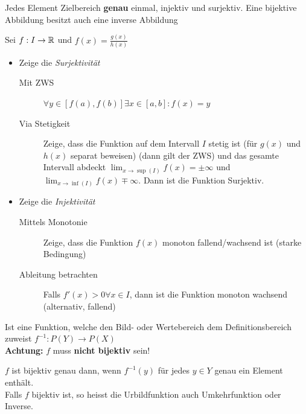 \documentclass[a4paper]{article}
\begin{document}
	\begin{fdef}[bijektiv]
		Jedes Element Zielbereich \textbf{genau} einmal, injektiv
		und surjektiv. Eine bijektive Abbildung besitzt auch eine
		inverse Abbildung
	\end{fdef}
	\begin{fmerke}
		Sei $f: I\rightarrow \mathbb{R}$ und $f(x) = \frac{g(x)}{h(x)}$
		\begin{itemize}
		 \item Zeige die \emph{Surjektivität} 
		 	\begin{description}
		 	 \item[Mit ZWS] $\forall y \in [f(a), f(b)] \exists x \in [a,b]: f(x)=y$
		 	 \item[Via Stetigkeit] Zeige, dass die Funktion auf dem Intervall $I$ stetig ist (für $g(x)$ und $h(x)$ separat beweisen) (dann gilt der ZWS) und das gesamte Intervall abdeckt $\lim_{x \rightarrow \sup(I)} f(x) = \pm \infty$ und $\lim_{x\rightarrow \inf(I)} f(x) \mp \infty$. Dann ist die Funktion Surjektiv.
		 	\end{description}
		 \item Zeige die \emph{Injektivität}
		 	\begin{description}
		 	 \item[Mittels Monotonie] Zeige, dass die Funktion $f(x)$ monoton fallend/wachsend ist (starke Bedingung) 
		 	 \item[Ableitung betrachten] Falls $f'(x) > 0 \forall x \in I$, dann ist die Funktion monoton wachsend (alternativ, fallend)
		 	\end{description}

		\end{itemize}

	\end{fmerke}


\begin{multicols}{2}
	\begin{fdef}[Urbildfunktion]
		Ist eine Funktion, welche den Bild- oder Wertebereich dem
		Definitionsbereich zuweist $f^{-1}: P(Y) \rightarrow P(X)$\\
		\textbf{Achtung:} $f$ muss \textbf{nicht bijektiv} sein!
	\end{fdef}

	\begin{fsatz}[]\vspace{-1mm}
		$f$ ist bijektiv genau dann, wenn $f^{-1}({y})$ für jedes $y \in
		Y$ genau ein Element enthält.\\
		Falls $f$ bijektiv ist, so heisst die Urbildfunktion auch
		Umkehrfunktion oder Inverse.
	\end{fsatz}
\end{multicols}
\end{document}
